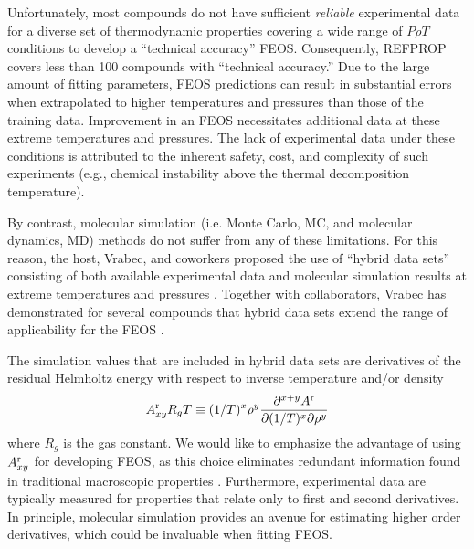 \documentclass[12pt,a4paper]{article}
\begin{document}

Unfortunately, most compounds do not have sufficient \textit{reliable} experimental data for a diverse set of thermodynamic properties covering a wide range of $P \rho T$ conditions to develop a ``technical accuracy'' FEOS. Consequently, REFPROP covers less than 100 compounds with ``technical accuracy.'' Due to the large amount of fitting parameters, FEOS predictions can result in substantial errors when extrapolated to higher temperatures and pressures than those of the training data. Improvement in an FEOS necessitates additional data at these extreme temperatures and pressures. The lack of experimental data under these conditions is attributed to the inherent safety, cost, and complexity of such experiments (e.g., chemical instability above the thermal decomposition temperature).

By contrast, molecular simulation (i.e. Monte Carlo, MC, and molecular dynamics, MD) methods do not suffer from any of these limitations. For this reason, the host, Vrabec, and coworkers proposed the use of ``hybrid data sets'' consisting of both available experimental data and molecular simulation results at extreme temperatures and pressures  \cite{Rutkai2013}. Together with collaborators, Vrabec has  demonstrated for several compounds that hybrid data sets extend the range of applicability for the FEOS \cite{Thol2016_siloxane_first,Thol2016_siloxane,Thol2017,Rutkai2013,Thol2015}. 

The simulation values that are included in hybrid data sets are derivatives of the residual Helmholtz energy with respect to inverse temperature and/or density
\begin{equation} \label{Residual Derivatives}
A_{xy}^{\rm r} R_gT \equiv (1/T)^x\rho^y \frac{\partial^{x+y}A^{\rm r}}{\partial(1/T)^x \partial \rho^y}
\end{equation}
where $R_g$ is the gas constant. We would like to emphasize the advantage of using $A_{xy}^{\rm r}$ for developing FEOS, as this choice eliminates redundant information found in traditional macroscopic properties \cite{Thol2016_LJ,Thol_LJTS,Rutkai2017,Lustig2015,Rutkai2013,Rutkai2015}. Furthermore, experimental data are typically measured for properties that relate only to first and second derivatives. In principle, molecular simulation provides an avenue for estimating higher order derivatives, which could be invaluable when fitting FEOS. 
\end{document}
